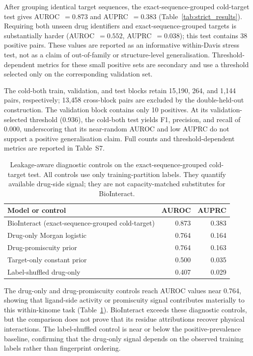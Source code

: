 \documentclass[fleqn,10pt]{wlscirep}
\begin{document}
After grouping identical target sequences, the \begingroup\color{red}exact-sequence-grouped cold-target\endgroup{} test gives
AUROC~$=0.873$ and AUPRC~$=0.383$ (Table~\ref{tab:strict_results}).  Requiring
both unseen drug identifiers and exact-sequence-grouped targets is substantially
harder (AUROC~$=0.552$, AUPRC~$=0.038$); this test contains 38 positive pairs.
These values are reported as an informative within-Davis stress test, not as a
claim of out-of-family or structure-level generalisation.  Threshold-dependent
metrics for these small positive sets are secondary and use a threshold selected
only on the corresponding validation set.

\begingroup\color{red}
The cold-both train, validation, and test blocks retain 15{,}190, 264, and
1{,}144 pairs, respectively; 13{,}458 cross-block pairs are excluded by the
double-held-out construction. The validation block contains only 10 positives.
At its validation-selected threshold (0.936), the cold-both test yields F1,
precision, and recall of 0.000, underscoring that its near-random AUROC and low
AUPRC do not support a positive generalisation claim. Full counts and
threshold-dependent metrics are reported in Table~S7.
\endgroup

\begin{table}[htbp]
\centering
\caption{Leakage-aware diagnostic controls on the exact-sequence-grouped
  cold-target test. All controls use only training-partition labels. They
  quantify available drug-side signal; they are not capacity-matched substitutes
  for BioInteract.}
\label{tab:diagnostic_controls}
\begin{tabular}{lrr}
\toprule
\textbf{Model or control} & \textbf{AUROC} & \textbf{AUPRC} \\
\midrule
BioInteract (\begingroup\color{red}exact-sequence-grouped cold-target\endgroup) & 0.873 & 0.383 \\
Drug-only Morgan logistic         & 0.764 & 0.164 \\
Drug-promiscuity prior            & 0.764 & 0.163 \\
Target-only constant prior        & 0.500 & 0.035 \\
Label-shuffled drug-only          & 0.407 & 0.029 \\
\bottomrule
\end{tabular}
\end{table}

The drug-only and drug-promiscuity controls reach AUROC values near 0.764,
showing that ligand-side activity or promiscuity signal contributes materially
to this within-kinome task (Table~\ref{tab:diagnostic_controls}).  BioInteract
exceeds these diagnostic controls, but the comparison does not prove that its
residue attributions recover physical interactions.  The label-shuffled control
is near or below the positive-prevalence baseline, confirming that the drug-only
signal depends on the observed training labels rather than fingerprint ordering.
\end{document}
